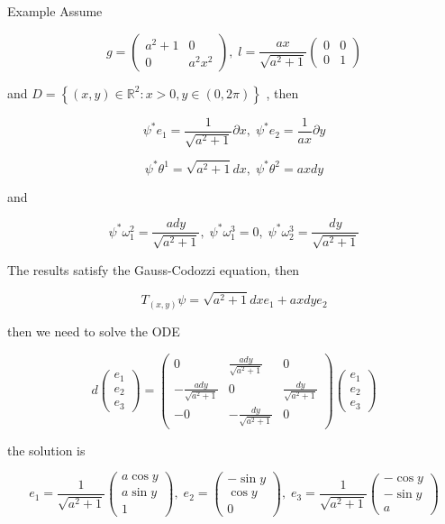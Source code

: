 \documentclass[lang=cn,a4paper,11pt,openany,twoside]{elegantbook}
\begin{document}
Example Assume

\[
g = \left( \begin{matrix} {a}^{2} + 1 & 0 \\  0 & {a}^{2}{x}^{2} \end{matrix}\right) ,\;l = \frac{ax}{\sqrt{{a}^{2} + 1}}\left( \begin{array}{ll} 0 & 0 \\  0 & 1 \end{array}\right)
\]

and \(D = \left\{  {\left( {x,y}\right)  \in  {\mathbb{R}}^{2} : x > 0,y \in  \left( {0,{2\pi }}\right) }\right\}\) , then

\[
{\psi }^{ * }{e}_{1} = \frac{1}{\sqrt{{a}^{2} + 1}}\partial x,\;{\psi }^{ * }{e}_{2} = \frac{1}{ax}\partial y
\]

\[
{\psi }^{ * }{\theta }^{1} = \sqrt{{a}^{2} + 1}{dx},\;{\psi }^{ * }{\theta }^{2} = {axdy}
\]

and

\[
{\psi }^{ * }{\omega }_{1}^{2} = \frac{ady}{\sqrt{{a}^{2} + 1}},\;{\psi }^{ * }{\omega }_{1}^{3} = 0,\;{\psi }^{ * }{\omega }_{2}^{3} = \frac{dy}{\sqrt{{a}^{2} + 1}}
\]

The results satisfy the Gauss-Codozzi equation, then

\[
{T}_{\left( x,y\right) }\psi  = \sqrt{{a}^{2} + 1}{dx}{e}_{1} + {axdy}{e}_{2}
\]

then we need to solve the ODE

\[
d\left( \begin{array}{l} {e}_{1} \\  {e}_{2} \\  {e}_{3} \end{array}\right)  = \left( \begin{matrix} 0 & \frac{ady}{\sqrt{{a}^{2} + 1}} & 0 \\   - \frac{ady}{\sqrt{{a}^{2} + 1}} & 0 & \frac{dy}{\sqrt{{a}^{2} + 1}} \\   - 0 &  - \frac{dy}{\sqrt{{a}^{2} + 1}} & 0 \end{matrix}\right) \left( \begin{array}{l} {e}_{1} \\  {e}_{2} \\  {e}_{3} \end{array}\right)
\]

the solution is

\[
{e}_{1} = \frac{1}{\sqrt{{a}^{2} + 1}}\left( \begin{matrix} a\cos y \\  a\sin y \\  1 \end{matrix}\right) ,\;{e}_{2} = \left( \begin{matrix}  - \sin y \\  \cos y \\  0 \end{matrix}\right) ,\;{e}_{3} = \frac{1}{\sqrt{{a}^{2} + 1}}\left( \begin{matrix}  - \cos y \\   - \sin y \\  a \end{matrix}\right)
\]
\end{document}
